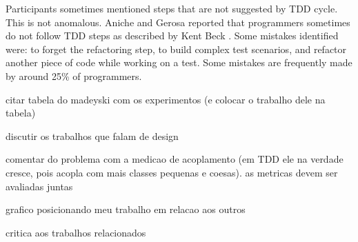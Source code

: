 Participants sometimes mentioned steps that are not suggested by TDD cycle. This
is not anomalous. Aniche and Gerosa \cite{aniche-gerosa} reported that
programmers sometimes do not follow TDD steps as described by Kent Beck \cite{tdd-by-example}.
Some mistakes identified were: to forget the refactoring step, to build complex
test scenarios, and refactor another piece of code while working on a test.
Some mistakes are frequently made by around 25\% of programmers.



citar tabela do madeyski com os experimentos (e colocar o trabalho dele na tabela)

discutir os trabalhos que falam de design

comentar do problema com a medicao de acoplamento (em TDD ele na verdade cresce, pois acopla com mais classes pequenas e coesas).
as metricas devem ser avaliadas juntas

grafico posicionando meu trabalho em relacao aos outros

critica aos trabalhos relacionados